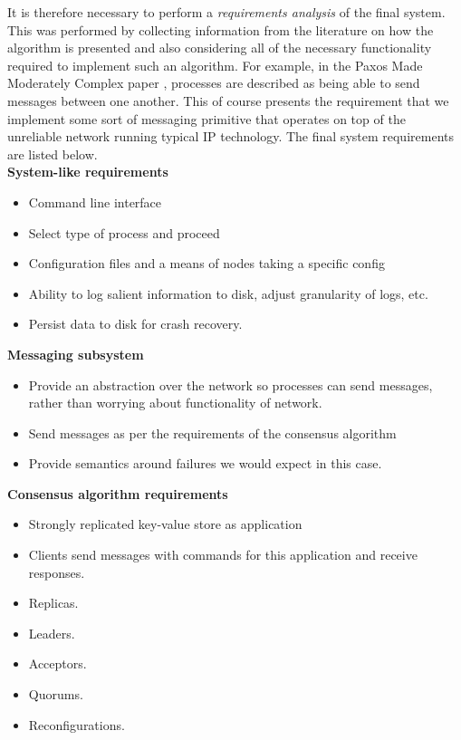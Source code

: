 It is therefore necessary to perform a \emph{requirements analysis} of the final system. This was performed by collecting information from the literature on how the algorithm is presented and also considering all of the necessary functionality required to implement such an algorithm. For example, in the Paxos Made Moderately Complex paper \cite{VanRenesse:2015:PMM:2737799.2673577}, processes are described as being able to send messages between one another. This of course presents the requirement that {\color{red}we} implement some sort of messaging primitive that operates on top of the unreliable network running typical IP technology. The final system requirements are listed below. \\

\textbf{System-like requirements}
\begin{itemize}
  \item Command line interface
  \item Select type of process and proceed
  \item Configuration files and a means of nodes taking a specific config
  \item Ability to log salient information to disk, adjust granularity of logs, etc.
  \item {\color{red}Persist data to disk for crash recovery.}
\end{itemize}

\textbf{Messaging subsystem}
\begin{itemize}
  \item Provide an abstraction over the network so processes can send messages, rather than worrying about functionality of network.
  \item Send messages as per the requirements of the consensus algorithm
  \item Provide semantics around failures we would expect in this case.
\end{itemize}

\textbf{Consensus algorithm requirements}
\begin{itemize}
  \item Strongly replicated key-value store as application
  \item Clients send messages with commands for this application and receive responses.
  \item Replicas.
  \item Leaders.
  \item Acceptors.
  \item Quorums.
  \item {\color{red}Reconfigurations.}
\end{itemize}

